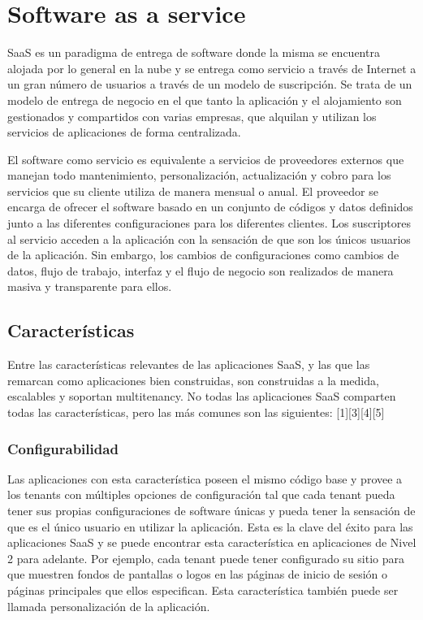 \section{Software as a service}
SaaS es un paradigma de entrega de software donde la misma se encuentra alojada por lo general en la nube y se entrega como servicio a través de Internet a un gran número de usuarios a través de un modelo de suscripción. Se trata de un modelo de entrega de negocio en el que tanto la aplicación y el alojamiento son gestionados y compartidos con varias empresas, que alquilan y utilizan los servicios de aplicaciones de forma centralizada\citep{gupta_software_2014}.

El software como servicio es equivalente a servicios de proveedores externos que manejan todo mantenimiento, personalización, actualización y cobro para los servicios que su cliente utiliza de manera mensual o anual. El proveedor se encarga de ofrecer el software basado en un conjunto de códigos y datos definidos junto a las diferentes configuraciones para los diferentes clientes. Los suscriptores al servicio acceden a la aplicación con la sensación de que son los únicos usuarios de la aplicación. Sin embargo, los cambios de configuraciones como cambios de datos, flujo de trabajo, interfaz y el flujo de negocio son realizados de manera masiva y transparente para ellos\citep{kumar_cloud_2012}\citep{kang_web_2012}.

\subsection{Características}
Entre las características relevantes de las aplicaciones SaaS, y las que las remarcan como aplicaciones bien construidas, son construidas a la medida, escalables y soportan multitenancy. No todas las aplicaciones SaaS comparten todas las características, pero las más comunes son las siguientes: [1][3][4][5]

\subsubsection{Configurabilidad}
Las aplicaciones con esta característica poseen el mismo código base y provee a los tenants con múltiples opciones de configuración tal que cada tenant pueda tener sus propias configuraciones de software únicas y pueda tener la sensación de que es el único usuario en utilizar la aplicación. Esta es la clave del éxito para las aplicaciones SaaS y se puede encontrar esta característica en aplicaciones de Nivel 2 para adelante. Por ejemplo, cada tenant puede tener configurado su sitio para que muestren fondos de pantallas o logos en las páginas de inicio de sesión o páginas principales que ellos especifican. Esta característica también puede ser llamada personalización de la aplicación.

